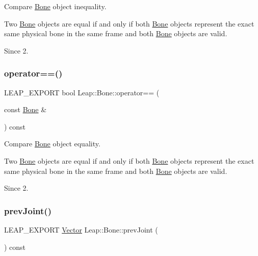 Compare \hyperlink{class_leap_1_1_bone}{Bone} object inequality.

Two \hyperlink{class_leap_1_1_bone}{Bone} objects are equal if and only if both \hyperlink{class_leap_1_1_bone}{Bone} objects represent the exact same physical bone in the same frame and both \hyperlink{class_leap_1_1_bone}{Bone} objects are valid. \begin{DoxySince}{Since}
2. 
\end{DoxySince}
\mbox{\label{class_leap_1_1_bone_ab76b765abf359b2c3e85d60a07673d55}} 
\subsubsection{\texorpdfstring{operator==()}{operator==()}}
{\footnotesize\ttfamily L\+E\+A\+P\+\_\+\+E\+X\+P\+O\+RT bool Leap\+::\+Bone\+::operator== (\begin{DoxyParamCaption}\item[{const \hyperlink{class_leap_1_1_bone}{Bone} \&}]{ }\end{DoxyParamCaption}) const}

Compare \hyperlink{class_leap_1_1_bone}{Bone} object equality.

Two \hyperlink{class_leap_1_1_bone}{Bone} objects are equal if and only if both \hyperlink{class_leap_1_1_bone}{Bone} objects represent the exact same physical bone in the same frame and both \hyperlink{class_leap_1_1_bone}{Bone} objects are valid. \begin{DoxySince}{Since}
2. 
\end{DoxySince}
\mbox{\label{class_leap_1_1_bone_a4bb40ba22404ed3626969fd035773bf9}} 
\subsubsection{\texorpdfstring{prev\+Joint()}{prevJoint()}}
{\footnotesize\ttfamily L\+E\+A\+P\+\_\+\+E\+X\+P\+O\+RT \hyperlink{struct_leap_1_1_vector}{Vector} Leap\+::\+Bone\+::prev\+Joint (\begin{DoxyParamCaption}{ }\end{DoxyParamCaption}) const}

